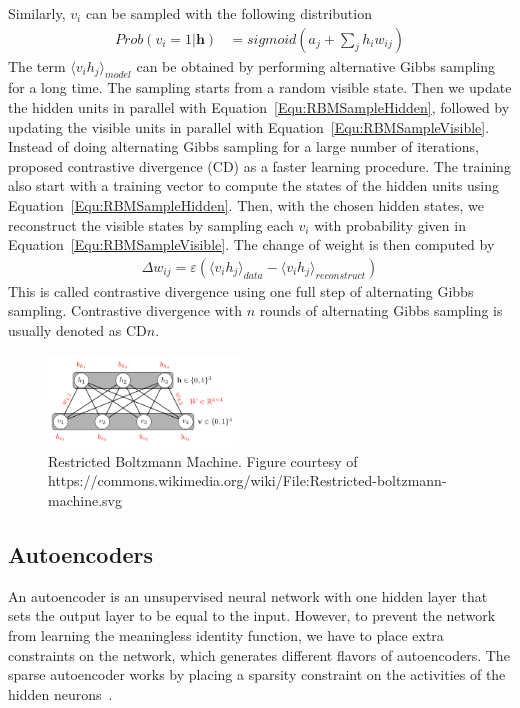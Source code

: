 Similarly, $v_i$ can be sampled with the following distribution
\begin{align}
    Prob(v_i = 1 | \mathbf{h}) &= sigmoid(a_j + \sum_j{h_i w_{ij}})
    \label{Equ:RBMSampleVisible}
\end{align}
The term $\langle v_i h_j \rangle_{model}$ can be obtained by performing alternative Gibbs
sampling for a long time.
The sampling starts from a random visible state.
Then we update the hidden units in parallel with Equation~\ref{Equ:RBMSampleHidden},
followed by updating the visible units in parallel with Equation~\ref{Equ:RBMSampleVisible}.
Instead of doing alternating Gibbs sampling for a large number of iterations,
\cite{TrainCD} proposed contrastive divergence (CD) as a faster learning procedure.
The training also start with a training vector to compute the states of the hidden units
using Equation~\ref{Equ:RBMSampleHidden}.
Then, with the chosen hidden states, we reconstruct the visible states by sampling each $v_i$
with probability given in Equation~\ref{Equ:RBMSampleVisible}.
The change of weight is then computed by
\begin{align}
    \Delta w_{ij} = \varepsilon (\langle v_i h_j \rangle_{data} -
    \langle v_i h_j \rangle_{reconstruct})
    \label{Equ:RBMCD1}
\end{align}
This is called contrastive divergence using one full step of alternating Gibbs sampling.
Contrastive divergence with $n$ rounds of alternating Gibbs sampling
is usually denoted as CD$n$.

\begin{figure}[h]
    \centering
    \includegraphics[width=0.45\textwidth]{figures/rbm.png}
    \caption{Restricted Boltzmann Machine.
        Figure courtesy of https://commons.wikimedia.org/wiki/File:Restricted-boltzmann-machine.svg}
    \label{Fig:RBMArchitecture}
\end{figure}

\fi

\subsection{Autoencoders}
An autoencoder is an unsupervised neural network with one hidden layer that sets the output layer to be equal to the input.
However, to prevent the network from learning the meaningless identity function, we have to place extra constraints on the network, which generates different flavors of autoencoders.
The sparse autoencoder works by placing a sparsity constraint on the activities of the hidden neurons~\cite{SparseAE}.

